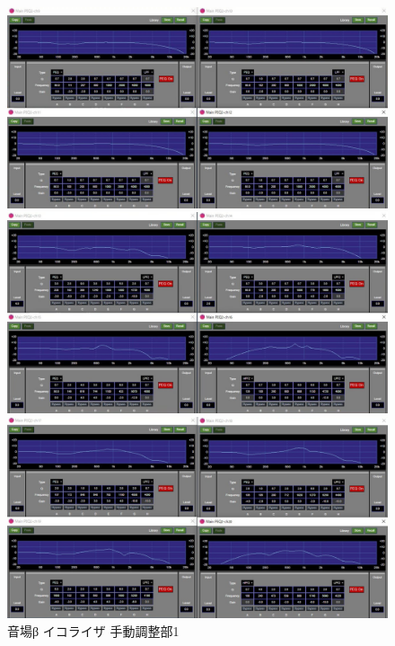 \documentclass[11pt,a4j]{jreport}
\begin{document}
\begin{figure}[H]
  \begin{minipage}[b]{.5\linewidth}
    \centering
    \includegraphics[width=.9\linewidth]{images/experimentField/afcParameters/02beta/04manualEQ3.jpg}
  \end{minipage}%
  \begin{minipage}[b]{.5\linewidth}
    \centering
    \includegraphics[width=.9\linewidth]{images/experimentField/afcParameters/02beta/04manualEQ4.jpg}
  \end{minipage}

  \begin{minipage}[b]{1\linewidth}
    \centering
    \includegraphics[width=.45\linewidth]{images/experimentField/afcParameters/02beta/04manualEQ5.jpg}
  \end{minipage}

  \centering
  \caption{音場β イコライザ 手動調整部1}
  \label{fig:betaイコライザ手動調整部1}
\end{figure}
\end{document}
